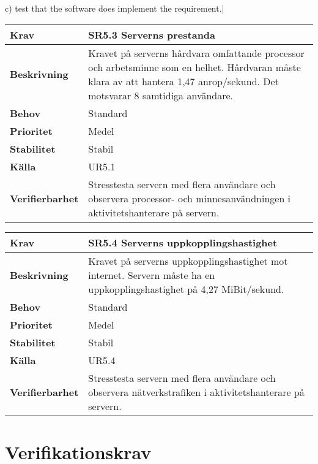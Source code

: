 \documentclass[a4paper, twoside, 11pt, titlepage]{article}
\begin{document}
c) test that the software does implement the requirement.|

\begin{tabular} { p{2.6cm} p{12.5cm} }
	\hline
	\sffamily\textbf{Krav} & \sffamily\textbf{SR5.3 Serverns prestanda } \\
	\hline
	\sffamily\textbf{Beskrivning} & Kravet på serverns hårdvara omfattande processor och arbetsminne som en helhet. Hårdvaran måste klara av att hantera 1,47 anrop/sekund. Det motsvarar 8 samtidiga användare.  \\
	\hline
	\sffamily\textbf{Behov} & Standard  \\
	\hline
	\sffamily\textbf{Prioritet} & Medel  \\
	\hline
	\sffamily\textbf{Stabilitet} & Stabil  \\
	\hline
	\sffamily\textbf{Källa} & UR5.1  \\
	\hline
	\sffamily\textbf{Verifierbarhet} & Stresstesta servern med flera användare och observera processor- och minnesanvändningen i aktivitetshanterare på servern.  \\
	\hline
\end{tabular}
\vspace{6mm}

\begin{tabular} { p{2.6cm} p{12.5cm} }
	\hline
	\sffamily\textbf{Krav} & \sffamily\textbf{SR5.4 Serverns uppkopplingshastighet } \\
	\hline
	\sffamily\textbf{Beskrivning} & Kravet på serverns uppkopplingshastighet mot internet. Servern måste ha en uppkopplingshastighet på 4,27 MiBit/sekund.  \\
	\hline
	\sffamily\textbf{Behov} & Standard  \\
	\hline
	\sffamily\textbf{Prioritet} & Medel  \\
	\hline
	\sffamily\textbf{Stabilitet} & Stabil  \\
	\hline
	\sffamily\textbf{Källa} & UR5.4  \\
	\hline
	\sffamily\textbf{Verifierbarhet} & Stresstesta servern med flera användare och observera nätverkstrafiken i aktivitetshanterare på servern.  \\
	\hline
\end{tabular}


\clearpage
\section{Verifikationskrav}
\end{document}
